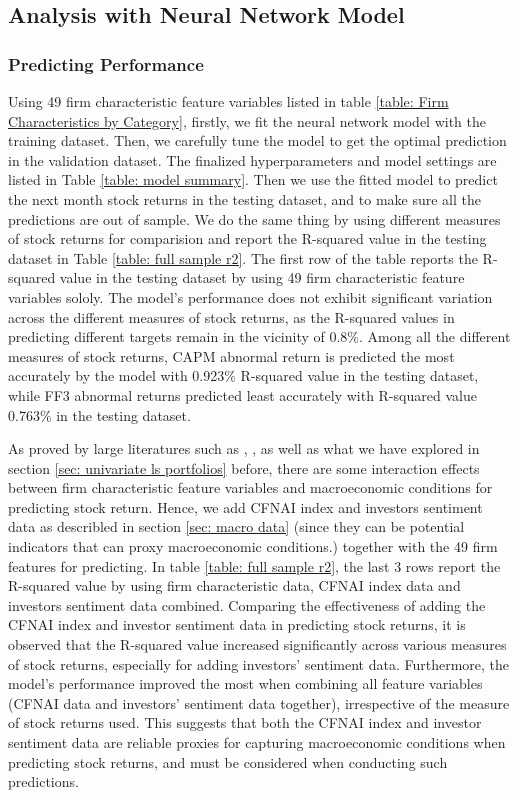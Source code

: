 \subsection{Analysis with Neural Network Model}

\subsubsection{Predicting Performance}
Using 49 firm characteristic feature variables listed in table \ref{table: Firm Characteristics by Category}, firstly, we fit the neural network model with the training dataset. Then, we carefully tune the model to get the optimal prediction in the validation dataset. The finalized hyperparameters and model settings are listed in Table \ref{table: model summary}. Then we use the fitted model to predict the next month stock returns in the testing dataset, and to make sure all the predictions are out of sample. We do the same thing by using different measures of stock returns for comparision and report the R-squared value in the testing dataset in Table \ref{table: full sample r2}. The first row of the table reports the R-squared value in the testing dataset by using 49 firm characteristic feature variables sololy. The model's performance does not exhibit significant variation across the different measures of stock returns, as the R-squared values in predicting different targets remain in the vicinity of 0.8\%. Among all the different measures of stock returns, CAPM abnormal return is predicted the most accurately by the model with 0.923\% R-squared value in the testing dataset, while FF3 abnormal returns predicted least accurately with R-squared value 0.763\% in the testing dataset.

As proved by large literatures such as \citet*{cochrane2005financial}, \citet*{welch2008comprehensive}, as well as what we have explored in section \ref{sec: univariate ls portfolios} before, there are some interaction effects between firm characteristic feature variables and macroeconomic conditions for predicting stock return. Hence, we add CFNAI index and investors sentiment data as describled in section \ref{sec: macro data} (since they can be potential indicators that can proxy macroeconomic conditions.) together with the 49 firm features for predicting. In table \ref{table: full sample r2}, the last 3 rows report the R-squared value by using firm characteristic data, CFNAI index data and investors sentiment data combined. Comparing the effectiveness of adding the CFNAI index and investor sentiment data in predicting stock returns, it is observed that the R-squared value increased significantly across various measures of stock returns, especially for adding investors' sentiment data. Furthermore, the model's performance improved the most when combining all feature variables (CFNAI data and investors' sentiment data together), irrespective of the measure of stock returns used. This suggests that both the CFNAI index and investor sentiment data are reliable proxies for capturing macroeconomic conditions when predicting stock returns, and must be considered when conducting such predictions.

